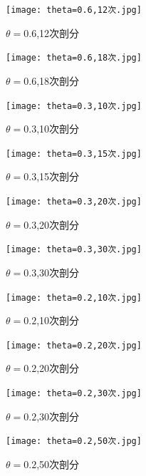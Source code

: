 \documentclass[12pt,fontset=mac]{ctexart}
\begin{document}
\begin{figure}[H]
	\centering
	\begin{minipage}[t]{0.48\textwidth}
		\centering
		\texttt{[image: theta=0.6,12次.jpg]}
		\caption{$\theta=0.6$,12次剖分}
	\end{minipage}
	\begin{minipage}[t]{0.48\textwidth}
		\centering
		\texttt{[image: theta=0.6,18次.jpg]}
		\caption{$\theta=0.6$,18次剖分}
	\end{minipage}
\end{figure}
\begin{figure}[H]
	\centering
	\begin{minipage}[t]{0.48\textwidth}
		\centering
		\texttt{[image: theta=0.3,10次.jpg]}
		\caption{$\theta=0.3$,10次剖分}
	\end{minipage}
	\begin{minipage}[t]{0.48\textwidth}
		\centering
		\texttt{[image: theta=0.3,15次.jpg]}
		\caption{$\theta=0.3$,15次剖分}
	\end{minipage}
\end{figure}
\begin{figure}[H]
	\centering
	\begin{minipage}[t]{0.48\textwidth}
		\centering
		\texttt{[image: theta=0.3,20次.jpg]}
		\caption{$\theta=0.3$,20次剖分}
	\end{minipage}
	\begin{minipage}[t]{0.48\textwidth}
		\centering
		\texttt{[image: theta=0.3,30次.jpg]}
		\caption{$\theta=0.3$,30次剖分}
	\end{minipage}
\end{figure}
\begin{figure}[H]
	\centering
	\begin{minipage}[t]{0.48\textwidth}
		\centering
		\texttt{[image: theta=0.2,10次.jpg]}
		\caption{$\theta=0.2$,10次剖分}
	\end{minipage}
	\begin{minipage}[t]{0.48\textwidth}
		\centering
		\texttt{[image: theta=0.2,20次.jpg]}
		\caption{$\theta=0.2$,20次剖分}
	\end{minipage}
\end{figure}
\begin{figure}[H]
	\centering
	\begin{minipage}[t]{0.48\textwidth}
		\centering
		\texttt{[image: theta=0.2,30次.jpg]}
		\caption{$\theta=0.2$,30次剖分}
	\end{minipage}
	\begin{minipage}[t]{0.48\textwidth}
		\centering
		\texttt{[image: theta=0.2,50次.jpg]}
		\caption{$\theta=0.2$,50次剖分}
	\end{minipage}
\end{figure}
\end{document}
